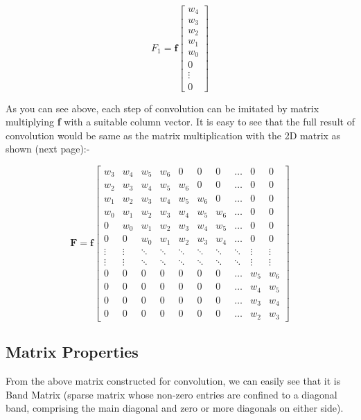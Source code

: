 \documentclass[12pt]{article}
\begin{document}
\[
F_1 = \mathbf{f} \begin{bmatrix}
w_4 \\
w_3 \\
w_2 \\
w_1 \\
w_0 \\
0 \\
\vdots \\
0
\end{bmatrix}
\]

As you can see above, each step of convolution can be imitated by matrix multiplying \textbf{f} with a suitable column vector. It is easy to see that the full result of convolution would be same as the matrix multiplication with the 2D matrix as shown (next page):-

\[
\mathbf{F} = \mathbf{f} \begin{bmatrix}
w_3 & w_4 & w_5 & w_6 & 0 & 0 & 0 & \hdots & 0 & 0\\
w_2 & w_3 & w_4 & w_5 & w_6 & 0 & 0 & \hdots & 0 & 0\\
w_1 & w_2 & w_3 & w_4 & w_5 & w_6 & 0 & \hdots & 0 & 0\\
w_0 & w_1 & w_2 & w_3 & w_4 & w_5 & w_6 & \hdots & 0 & 0\\
0 & w_0 & w_1 & w_2 & w_3 & w_4 & w_5 & \hdots & 0 & 0\\
0 & 0 & w_0 & w_1 & w_2 & w_3 & w_4 & \hdots & 0 & 0\\
\vdots & \vdots & \ddots & \ddots & \ddots & \ddots & \ddots & \ddots & \vdots & \vdots\\
\vdots & \vdots & \ddots & \ddots & \ddots & \ddots & \ddots & \ddots & \vdots & \vdots\\
0 & 0 & 0 & 0 & 0 & 0 & 0 & \hdots & w_5 & w_6\\
0 & 0 & 0 & 0 & 0 & 0 & 0 & \hdots & w_4 & w_5\\
0 & 0 & 0 & 0 & 0 & 0 & 0 & \hdots & w_3 & w_4\\
0 & 0 & 0 & 0 & 0 & 0 & 0 & \hdots & w_2 & w_3
\end{bmatrix}
\]

\subsection*{Matrix Properties}
From the above matrix constructed for convolution, we can easily see that it is Band Matrix (sparse matrix whose non-zero entries are confined to a diagonal band, comprising the main diagonal and zero or more diagonals on either side).
\end{document}
